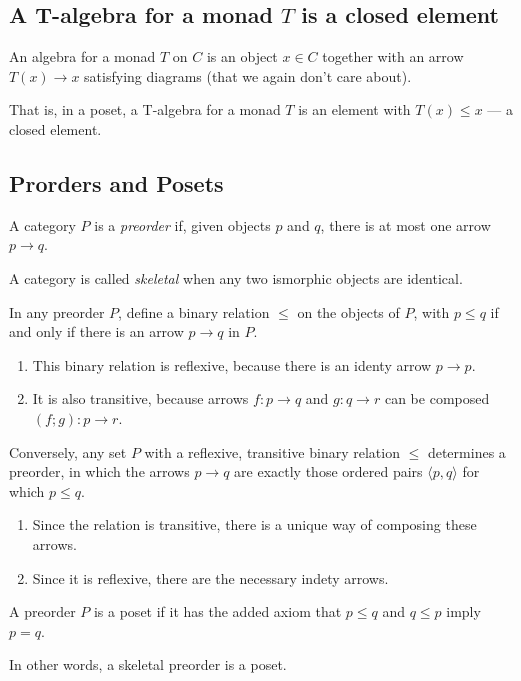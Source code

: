 \documentclass[dvipdfmx,autodetect-engine]{jsarticle}
\begin{document}
\subsection{A T-algebra for a monad $T$  is a closed element}

\begin{definition}
An algebra for a monad $T$ on $C$ is an object $x \in C$ 
together with an arrow $T(x) \rightarrow x$  satisfying diagrams (that we again don't care about). 
\end{definition}

That is, in a poset, a T-algebra for a monad $T$ is an element 
 with $T(x) \leq x$  — a closed element.
 
\subsection{Prorders and Posets}

 \begin{definition} [Preorders]
A category $P$ is a {\em preorder} if, given objects $p$ and $q$, there is at most one arrow $p \rightarrow q$. 
\end{definition}

\begin{definition}  
A category is called {\em skeletal} when any two ismorphic objects are identical. 
\end{definition}

In any preorder $P$, 
define a binary relation $\leq$ on the objects of $P$, 
with $p \leq q$ if and only if there is an arrow $p \rightarrow q$ in $P$.

\begin{enumerate}
    \item  This binary relation is reflexive, 
    because there is an identy arrow $p \rightarrow p$. 
    \item It is also transitive, 
    because arrows $f: p \rightarrow q$ and $g: q \rightarrow r$ can be composed $ (f ; g) : p \rightarrow r$. 
\end{enumerate}

Conversely, any set $P$ with a reflexive, transitive binary relation $\leq$ determines a preorder,
in which the arrows $p \rightarrow q$ are exactly those ordered pairs 
$\langle p,q \rangle$ for which $p \leq q$. 
\begin{enumerate}
    \item Since the relation is  transitive, there is a unique way of composing these arrows.
    \item Since it is reflexive, there are the necessary indety arrows. 
\end{enumerate}

\begin{definition} [Posets]
A preorder  $P$ is a poset if it has the added axiom that $p \leq q$ and $q \leq p$ imply $p = q$.
\end{definition}

In other words, a skeletal preorder is a poset. 


 
% 
\end{document}
